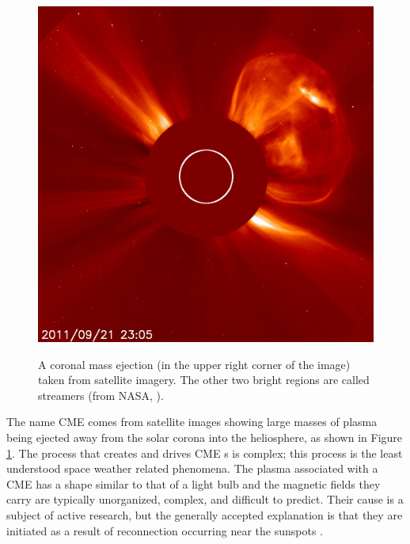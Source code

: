 \begin{figure}
	\centering
	\includegraphics[scale=0.3]{images/NASA_CME.jpg}\\
	\caption{A coronal mass ejection (in the upper right corner of the image)
	taken from satellite imagery. The other two bright regions are called
	streamers (from NASA, \citeyear{CME}).}
	\label{fig:NASACME}
	\figSpace
\end{figure}
The name CME comes from satellite images showing large masses of plasma being
ejected away from the solar corona into the heliosphere, as shown in Figure
\ref{fig:NASACME}. The process that creates and drives CME	s is complex; this
process is the least understood space weather related phenomena. The plasma
associated with a CME has a shape similar to that of a light bulb and the
magnetic fields they carry are typically unorganized, complex, and difficult
to predict. Their cause is a subject of active research, but the generally
accepted explanation is that they are initiated as a result of reconnection
occurring near the sunspots \citep{Priest}.

